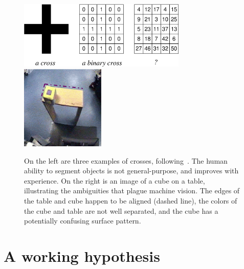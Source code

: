 %
\begin{figure}[tb]
\begin{center}
\includegraphics[width=8.0cm]{number-cross.eps}
\hspace{2cm}
\includegraphics[width=4cm]{setup-sequence.eps}
\caption{ 
%
On the left are three examples of crosses,
following~\cite{manzotti01coscienza}.  The human ability to segment
objects is not general-purpose, and improves with experience.
On the right is an image of a cube on a table, illustrating the
ambiguities that plague machine vision. 
The edges of the table and cube happen to be
aligned (dashed line), the colors of the cube and table are not well
separated, and the cube has a potentially confusing surface pattern.
%
\label{fig:number-cross}
}
\end{center}
\end{figure}
%
%

\fi



%
%
%




\ifrev

\else

\section{A working hypothesis}


